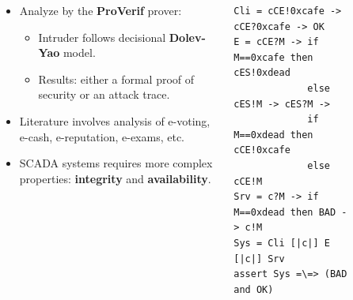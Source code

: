 \documentclass{beamer}
\newcommand{\proverif}{ProVerif\xspace}
\begin{document}
\begin{frame}[fragile]{}
\begin{tcolorbox}[adjusted title={\centering\large Formal Analysis of SCADA Protocols}]
\begin{columns}[T]
\begin{column}{.35\textwidth}
\begin{tcolorbox}
\begin{itemize}
                        \item Analyze by the {\bf \proverif} prover:
                        \begin{itemize}
                            \item Intruder follows decisional {\bf Dolev-Yao} model.
                            \item Results: either a formal proof of security or an attack trace.
                        \end{itemize}
                    \vspace{.5em}
                        \item Literature involves analysis of e-voting, e-cash, e-reputation, e-exams, etc.
                    \vspace{.5em}
                    \item SCADA systems requires more complex properties: {\bf integrity} and {\bf availability}.
                    \end{itemize}
                \end{tcolorbox}
            \end{column}
            \begin{column}{.65\textwidth}
                \begin{tcolorbox}[
                colback=white, %
                colframe=normalTitleBlockColor, %
                colframe=gray!20, %
                boxrule=1mm,
                coltext=black, %
                coltitle=black, %
                bottom=2mm,
                equal height group=B,
                valign = center,
                adjusted title={\large Approach}]
                    \begin{columns}[T]
                        \begin{column}{.45\textwidth}
\begin{lstlisting}
Cli = cCE!0xcafe -> cCE?0xcafe -> OK
E = cCE?M -> if M==0xcafe then cES!0xdead
             else cES!M -> cES?M ->
             if M==0xdead then cCE!0xcafe
             else cCE!M
Srv = c?M -> if M==0xdead then BAD -> c!M
Sys = Cli [|c|] E [|c|] Srv
assert Sys =\=> (BAD and OK)
\end{lstlisting}
                        \end{column}
                        \begin{column}{.55\textwidth}
                            \begin{figure}[htb]

\end{figure}
\end{column}
\end{columns}
\end{tcolorbox}
\end{column}
\end{columns}
\end{tcolorbox}
\end{frame}
\end{document}
